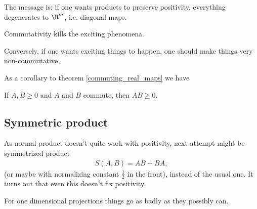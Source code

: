 The message is: if one wants products to preserve positivity, everything degenerates to $\R^{m}$, i.e. diagonal maps.

\begin{phil}
	Commutativity kills the exciting phenomena.
\end{phil}

Conversely, if one wants exciting things to happen, one should make things very non-commutative.

As a corollary to theorem \ref{commuting_real_maps} we have

\begin{kor}
	If $A, B \geq 0$ and $A$ and $B$ commute, then $AB \geq 0$.
\end{kor}

\subsection{Symmetric product}

As normal product doesn't quite work with positivity, next attempt might be symmetrized product
\begin{align*}
	S(A, B) = AB + BA,
\end{align*}
(or maybe with normalizing constant $\frac{1}{2}$ in the front), instead of the usual one. It turns out that even this doesn't fix positivity.

For one dimensional projections things go as badly as they possibly can.

